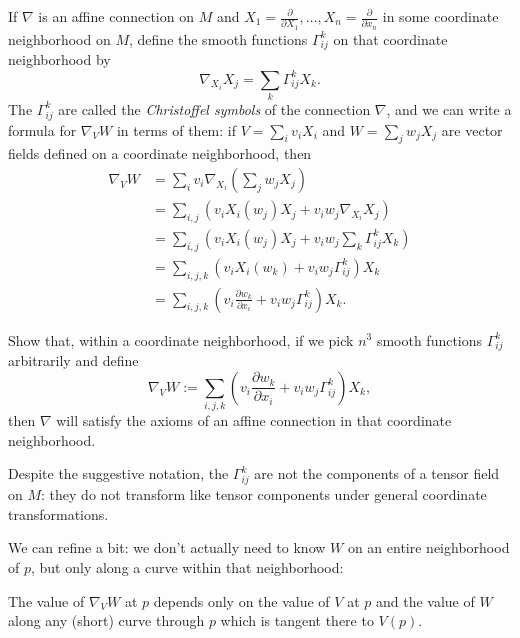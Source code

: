 If $\nabla$ is an affine connection on $M$ and $X_1 = \frac{\partial}{\partial X_1}, \dots , X_n = \frac{\partial}{\partial x_n}$ in some coordinate neighborhood on $M$, define the smooth functions $\Gamma_{ij}^k$ on that coordinate neighborhood by
\[
	\nabla_{X_i} X_j = \sum_{k} \Gamma_{ij}^k X_k.
\]
The $\Gamma_{ij}^k$ are called the \emph{Christoffel symbols} of the connection $\nabla$, and we can write a formula for $\nabla_V W$ in terms of them: if $V = \sum_i v_i X_i$ and $W = \sum_j w_j X_j$ are vector fields defined on a coordinate neighborhood, then
\begin{align*}
	\nabla_V W & = \sum_i v_i \nabla_{X_i} \left( \sum_j w_j X_j \right) \\
	& = \sum_{i,j}\left( v_i X_i(w_j) X_j + v_i w_j \nabla_{X_i} X_j \right) \\
	& = \sum_{i,j}\left( v_i X_i(w_j) X_j + v_i w_j \sum_k \Gamma_{ij}^k X_k \right) \\
	& = \sum_{i,j,k} \left( v_i X_i(w_k) + v_i w_j \Gamma_{ij}^k \right)X_k \\
	& = \sum_{i,j,k} \left( v_i \frac{\partial w_k}{\partial x_i} + v_i w_j \Gamma_{ij}^k \right)X_k .
\end{align*}

\begin{exercise}\label{ex:christoffel determines connection}
	Show that, within a coordinate neighborhood, if we pick $n^3$ smooth functions $\Gamma_{ij}^k$ arbitrarily and define
	\[
		\nabla_V W := \sum_{i,j,k} \left( v_i \frac{\partial w_k}{\partial x_i} + v_i w_j \Gamma_{ij}^k \right)X_k,
	\]
	then $\nabla$ will satisfy the axioms of an affine connection in that coordinate neighborhood.
\end{exercise}

\begin{remark}
	Despite the suggestive notation, the $\Gamma_{ij}^k$ are not the components of a tensor field on $M$: they do not transform like tensor components under general coordinate transformations.
\end{remark}

We can refine  a bit: we don't actually need to know $W$ on an entire neighborhood of $p$, but only along a curve within that neighborhood:

\begin{lemma}\label{lem:connection is local2}
	The value of $\nabla_V W$ at $p$ depends only on the value of $V$ at $p$ and the value of $W$ along any (short) curve through $p$ which is tangent there to $V(p)$.
\end{lemma}

